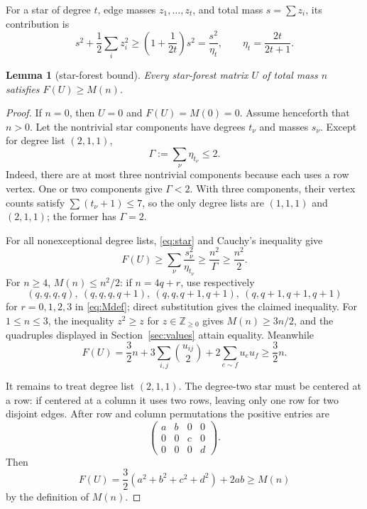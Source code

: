 \documentclass[11pt]{article}
\theoremstyle{plain}
\newtheorem{lemma}[theorem]{Lemma}
\theoremstyle{definition}
\theoremstyle{remark}
\newcommand{\1}{\mathbf 1}
\begin{document}
For a star of degree $t$, edge masses $z_1,\ldots,z_t$, and total mass
$s=\sum z_i$, its contribution is
\begin{equation}\label{eq:star}
 s^2+\frac12\sum_i z_i^2
 \geq\left(1+\frac1{2t}\right)s^2
 =\frac{s^2}{\eta_t},
 \qquad \eta_t=\frac{2t}{2t+1}.
\end{equation}

\begin{lemma}[star-forest bound]\label{lem:starforest}
Every star-forest matrix $U$ of total mass $n$ satisfies $F(U)\geq M(n)$.
\end{lemma}

\begin{proof}
If $n=0$, then $U=0$ and $F(U)=M(0)=0$.  Assume henceforth that $n>0$.
Let the nontrivial star components have degrees $t_\nu$ and masses $s_\nu$.
Except for degree list $(2,1,1)$,
\begin{equation}\label{eq:Gamma}
 \Gamma:=\sum_\nu\eta_{t_\nu}\leq2.
\end{equation}
Indeed, there are at most three nontrivial components because each uses a row
vertex.  One or two components give $\Gamma<2$.  With three components, their
vertex counts satisfy $\sum(t_\nu+1)\leq7$, so the only degree lists are
$(1,1,1)$ and $(2,1,1)$; the former has $\Gamma=2$.

For all nonexceptional degree lists, \eqref{eq:star} and Cauchy's inequality
give
\[
 F(U)\geq\sum_\nu\frac{s_\nu^2}{\eta_{t_\nu}}
 \geq\frac{n^2}{\Gamma}\geq\frac{n^2}{2}.
\]
For $n\geq4$, $M(n)\leq n^2/2$: if $n=4q+r$, use respectively
\[
 (q,q,q,q),\ (q,q,q,q+1),\ (q,q,q+1,q+1),\ (q,q+1,q+1,q+1)
\]
for $r=0,1,2,3$ in \eqref{eq:Mdef}; direct substitution gives the claimed
inequality.  For $1\leq n\leq3$, the inequality $z^2\geq z$ for
$z\in\mathbb Z_{\geq0}$ gives $M(n)\geq3n/2$, and the quadruples displayed
in Section~\ref{sec:values} attain equality.  Meanwhile
\[
 F(U)=\frac32n+3\sum_{i,j}\binom{u_{ij}}2
 +2\sum_{e\sim f}u_eu_f\geq\frac32n.
\]

It remains to treat degree list $(2,1,1)$.  The degree-two star must be centered
at a row: if centered at a column it uses two rows, leaving only one row for
two disjoint edges.  After row and column permutations the positive entries
are
\[
 \begin{pmatrix}a&b&0&0\\0&0&c&0\\0&0&0&d\end{pmatrix}.
\]
Then
\[
 F(U)=\frac32(a^2+b^2+c^2+d^2)+2ab\geq M(n)
\]
by the definition of $M(n)$.
\end{proof}
\end{document}
